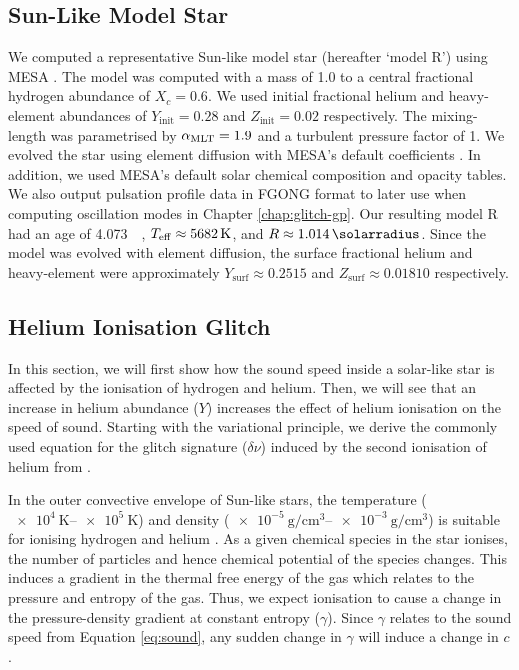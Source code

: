 \subsection{Sun-Like Model Star}\label{sec:model-s}

We computed a representative Sun-like model star (hereafter `model R') using MESA \citep[version 12115;][]{Paxton.Bildsten.ea2011,Paxton.Cantiello.ea2013,Paxton.Marchant.ea2015,Paxton.Schwab.ea2018,Paxton.Smolec.ea2019,Jermyn.Bauer.ea2023}. The model was computed with a mass of \SI{1.0}{\solarmass} to a central fractional hydrogen abundance of \(X_c=0.6\). We used initial fractional helium and heavy-element abundances of \(Y_\mathrm{init} = 0.28\) and \(Z_\mathrm{init}=0.02\) respectively. The mixing-length was parametrised by \({\alpha_\mathrm{MLT}}=1.9\) and a turbulent pressure factor of 1. We evolved the star using element diffusion with MESA's default coefficients \citep{Stanton.Murillo2016}. In addition, we used MESA's default \citet{Grevesse.Sauval1998} solar chemical composition and opacity tables. We also output pulsation profile data in FGONG format to later use when computing oscillation modes in Chapter \ref{chap:glitch-gp}. Our resulting model R had an age of \SI{4.073}{\giga\year}, \({T_\mathrm{eff}} \approx \SI{5682}{\kelvin}\), and \(R \approx \SI{1.014}{\solarradius}\). Since the model was evolved with element diffusion, the surface fractional helium and heavy-element were approximately \(Y_\mathrm{surf} \approx 0.2515\) and \(Z_\mathrm{surf} \approx 0.01810\) respectively.

\subsection{Helium Ionisation Glitch}\label{sec:helium-glitch}

In this section, we will first show how the sound speed inside a solar-like star is affected by the ionisation of hydrogen and helium. Then, we will see that an increase in helium abundance (\(Y\)) increases the effect of helium ionisation on the speed of sound. Starting with the variational principle, we derive the commonly used equation for the glitch signature (\(\delta\nu\)) induced by the second ionisation of helium from \citet{Houdek.Gough2007}.

In the outer convective envelope of Sun-like stars, the temperature (\(\SIrange{e4}{e5}{\kelvin}\)) and density (\(\SIrange{e-5}{e-3}{\gram\per\centi\metre\cubed}\)) is suitable for ionising hydrogen and helium \citep{Eggleton.Faulkner.ea1973}. As a given chemical species in the star ionises, the number of particles and hence chemical potential of the species changes. This induces a gradient in the thermal free energy of the gas which relates to the pressure and entropy of the gas. Thus, we expect ionisation to cause a change in the pressure-density gradient at constant entropy (\(\gamma\)). Since \(\gamma\) relates to the sound speed from Equation \ref{eq:sound}, any sudden change in \(\gamma\) will induce a change in \(c\).

